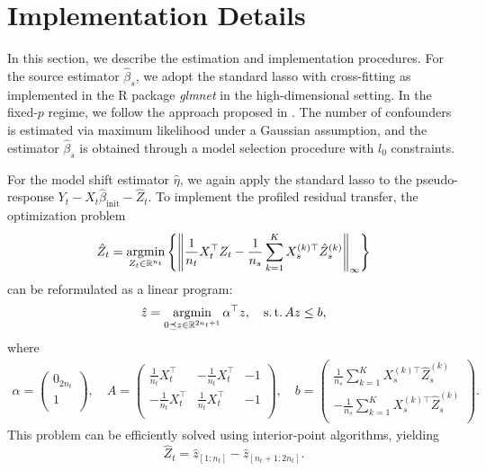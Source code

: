 \documentclass[12pt]{article}
\def\argmin{\mathop{\rm argmin}}
\begin{document}
\section{Implementation Details}
In this section, we describe the estimation and implementation procedures. For the source estimator $\hat{\beta}_s$, we adopt the standard lasso with cross-fitting as implemented in the R package \textit{glmnet} in the high-dimensional setting. In the fixed-$p$ regime, we follow the approach proposed in \cite{tang2023synthetic}. The number of confounders is estimated via maximum likelihood under a Gaussian assumption, and the estimator $\hat{\beta}_s$ is obtained through a model selection procedure with $l_0$ constraints.

For the model shift estimator $\hat{\eta}$, we again apply the standard lasso to the pseudo-response $Y_t - X_t \hat{\beta}_{\text{init}} - \hat{Z}_t$. To implement the profiled residual transfer, the optimization problem
\begin{align*}
    \hat{Z}_t = \argmin_{Z_t \in \mathbb{R}^{n_t}}\left\{\left\|\frac{1}{n_t}X_t^\top Z_t - \frac{1}{n_s}\sum_{k=1}^K X_s^{(k)\top}\hat{Z}_s^{(k)}\right\|_{\infty}\right\}
\end{align*}
can be reformulated as a linear program:
\begin{align*}
    \hat{z} = \argmin_{0\preceq z\in \mathbb{R}^{2n_t+1}} \alpha^\top z,\quad \operatorname{s.t.} Az\le b,
\end{align*}
where 
\begin{align*}
   \alpha = \left(\begin{matrix}0_{2n_t}\\1\\\end{matrix}\right),\quad A = \left(\begin{matrix}\frac{1}{n_t}X_t^\top&-\frac{1}{n_t}X_t^\top&-1\\-\frac{1}{n_t}X_t^\top&\frac{1}{n_t}X_t^\top&-1\\\end{matrix}\right),\quad b = \left(\begin{matrix}\frac{1}{n_s}\sum_{k=1}^K X_s^{(k)\top}\hat{Z}_s^{(k)}\\-\frac{1}{n_s}\sum_{k=1}^K X_s^{(k)\top}\hat{Z}_s^{(k)}\\\end{matrix}\right).
\end{align*}
This problem can be efficiently solved using interior-point algorithms, yielding 
$$\hat{Z}_t =\hat{z}_{[1:n_t]} - \hat{z}_{[n_t+1:2n_t]}.$$
\end{document}
